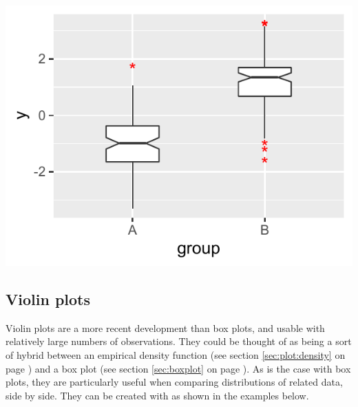 \documentclass[krantz2]{krantz}\usepackage{knitr}
\begin{document}
\begin{knitrout}\footnotesize
{}\color{fgcolor}\begin{kframe}
\begin{alltt}
  \hlopt{+}
  \hlstd{(} \hlstd{=} \hlstd{,}  \hlstd{=} \hlstd{,}
                \hlstd{=} \hlstd{,}  \hlstd{=} \hlstd{,}  \hlstd{=} \hlstd{)}
\end{alltt}
\end{kframe}

{\centering \includegraphics[width=.54\textwidth]{figure/pos-bw-plot-02-1}

}



\end{knitrout}


\subsection{Violin plots}\label{sec:plot:violin}

Violin plots are a more recent development than box plots, and usable with relatively large numbers of observations. They could be thought of as being a sort of hybrid between an empirical density function (see section \ref{sec:plot:density} on page \pageref{sec:plot:density}) and a box plot (see section \ref{sec:boxplot} on page \pageref{sec:boxplot}). As is the case with box plots, they are particularly useful when comparing distributions of related data, side by side. They can be created with   as shown in the examples below.

\begin{knitrout}\footnotesize
{}\color{fgcolor}\begin{kframe}
\begin{alltt}
  \hlopt{+}
  \hlstd{()}
\end{alltt}
\end{kframe}
\end{knitrout}
\end{document}
